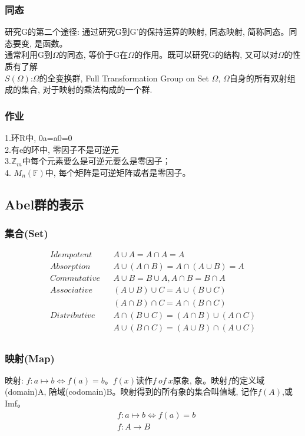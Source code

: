 \documentclass[UTF8]{../09-Mathematics}
\begin{document}
\subsubsection{同态}
研究G的第二个途径: 通过研究G到G'的保持运算的映射, 同态映射, 简称同态。同态要变, 是函数。\\
通常利用G到$\Omega$的同态, 等价于G在$\Omega$的作用。既可以研究G的结构, 又可以对$\Omega$的性质有了解\\
$S(\Omega)$:$\Omega$的全变换群, Full Transformation Group on Set $\Omega$, $\Omega$自身的所有双射组成的集合, 对于映射的乘法构成的一个群.\\

\subsubsection{作业}
1.环R中, 0a=a0=0 \\
2.有e的环中, 零因子不是可逆元\\
3.$\mathbb Z_m$中每个元素要么是可逆元要么是零因子；\\
4. $M_n(\mathbb F)$中, 每个矩阵是可逆矩阵或者是零因子。


\subsection{Abel群的表示}


\subsubsection{集合(Set)}
\begin{equation}
  \begin{aligned}
  Idempotent & & A \cup A = A \cap A = A \\
  Absorption & &A \cup (A \cap B) = A \cap (A \cup B) = A\\
  Commutative & &A \cup B = B \cup A, A \cap B = B \cap A\\
  Associative & &(A \cup B) \cup C = A \cup (B \cup C)\\
              & &(A \cap B) \cap C = A \cap (B \cap C)\\
  Distributive & &A \cap (B \cup C) = (A \cap B) \cup (A \cap C)\\
                & &A \cup (B \cap C) = (A \cup B) \cap (A \cup C)\\
  \end{aligned}
\end{equation}




\subsubsection{映射(Map)}
映射: $f:a \mapsto b \Leftrightarrow f(a)=b$。$f(x)读作f \ of \ x$原象, 象。映射$f$的定义域(domain)A, 陪域(codomain)B。映射得到的所有象的集合叫值域, 记作$f(A)$,或Imf。
\begin{equation}
  \begin{split}
  &f:a \mapsto b \Leftrightarrow f(a)=b\\
  &f: A \to B\\
  \end{split}
\end{equation}
\end{document}

